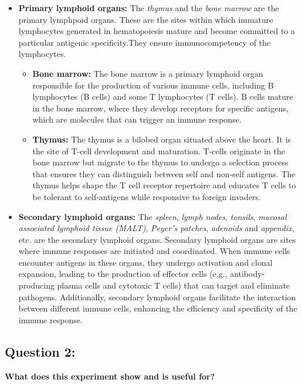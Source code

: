 \documentclass{article}
\begin{document}
    \begin{itemize}
      \item \textbf{Primary lymphoid organs:} The \textit{thymus} and the \textit{bone marrow} are the primary lymphpoid organs. These are the 
      sites within which immature lymphocytes generated in hematopoiesis mature and become committed to a particular antigenic specificity.They 
      ensure immunocompetency of the lymphocytes. 
        \begin{itemize}
          \item \textbf{Bone marrow:} The bone marrow is a primary lymphoid organ responsible for the production 
          of various immune cells, including B lymphocytes (B cells) and some T lymphocytes (T cells).
           B cells mature in the bone marrow, where they develop receptors for specific antigens, which are molecules that can trigger an immune response.
          \item \textbf{Thymus:} The thymus is a bilobed organ situated above the heart. 
          It is the site of T-cell development and maturation. 
          T-cells originate in the bone marrow but migrate to the thymus to undergo a selection process that 
          ensures they can distinguish between self and non-self antigens. 
          The thymus helps shape the T cell receptor repertoire and educates T cells to be tolerant to self-antigens while responsive to foreign invaders. 
          
        \end{itemize}
      \item \textbf{Secondary lymphoid organs:} The \textit{spleen}, \textit{lymph nodes}, \textit{tonsils}, \textit{mucosal associated lymphoid tissue (MALT)}, \textit{Peyer's patches}, \textit{adenoids} and \textit{appendix}, etc.
      are the secondary lymphoid organs.  Secondary lymphoid organs are sites where immune responses are initiated and coordinated. When immune cells encounter antigens in these organs,
       they undergo activation and clonal expansion, leading to the production of effector cells 
       (e.g., antibody-producing plasma cells and cytotoxic T cells) that can target and eliminate pathogens.
        Additionally, secondary lymphoid organs facilitate the interaction between different immune cells,
         enhancing the efficiency and specificity of the immune response.
      
    \end{itemize}


\subsection*{Question 2:} \textbf{What does this experiment show and is useful for?}
\end{document}
